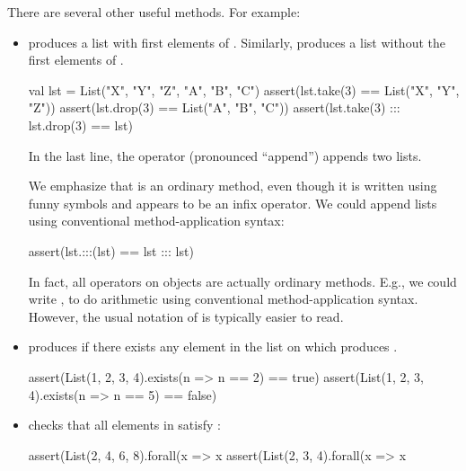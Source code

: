 \documentclass{book}
\begin{document}
There are several other useful methods. For example:

\begin{itemize}

  \item {} produces a list with first 
  elements of . Similarly,  produces
  a list without the first  elements of .
  \begin{scalacode}
  val lst = List("X", "Y", "Z", "A", "B", "C")
  assert(lst.take(3) == List("X", "Y", "Z"))
  assert(lst.drop(3) == List("A", "B", "C"))
  assert(lst.take(3) ::: lst.drop(3) == lst)
  \end{scalacode}

  In the last line, the \scalainline{:::} operator (pronounced ``append'')
  appends two lists.

  \begin{notation}
  We emphasize that \scalainline{:::} is an ordinary method,
  even though it is written using funny symbols and appears to be an infix
  operator. We could append lists using conventional method-application
  syntax:
  \begin{scalacode}
  assert(lst.:::(lst) == lst ::: lst)
  \end{scalacode}
  In fact, all operators on objects are actually ordinary methods. E.g.,
  we could write , to do arithmetic using
  conventional method-application syntax. However, the usual notation
  of  is typically easier to read.

  \end{notation}

  \item {} produces  if there
  exists any element in the list on which  produces
  .

  \begin{scalacode}
  assert(List(1, 2, 3, 4).exists(n => n == 2) == true)
  assert(List(1, 2, 3, 4).exists(n => n == 5) == false)
  \end{scalacode}

  \item {} checks that all elements in 
  satisfy :
  \begin{scalacode}
  assert(List(2, 4, 6, 8).forall(x => x %
  assert(List(2, 3, 4).forall(x => x %
  \end{scalacode}

\end{itemize}
\end{document}
